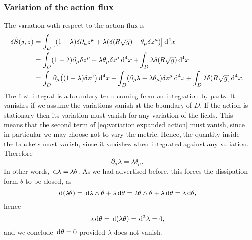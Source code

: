 \documentclass[../main.tex]{subfiles}
\begin{document}
\subsubsection{Variation of the action flux}\label{sec:variationonaction}
The variation with respect to the action flux is
\begin{align}
	\delta \tilde{S}(g, z) & = \int_D \big[(1-\lambda) \delta \partial_\mu z^\mu +
\lambda(\delta(R\sqrt{g}) - \theta_\mu \delta z^\mu)\big] \,\mathrm{d}^4 x \notag \\						& = \int_D (1 - \lambda) \partial_\mu \delta z^\mu -
			\lambda \theta_\mu \delta z^\mu \,\mathrm{d}^4x + \int_D \lambda
			\delta(R \sqrt{g}) \,\mathrm{d}^4 x \notag \\
& = \int_{D} \partial_\mu \big((1 -
		\lambda)\delta z^\mu\big) \,\mathrm{d}^4 x + \int_D (\partial_\mu \lambda
		- \lambda\theta_\mu) \delta z^\mu \,\mathrm{d}^4 x + \int_D \lambda
		\delta(R \sqrt{g}) \,\mathrm{d}^4 x \label{eq:variation expanded
										action}. 
\end{align}
The first integral is a boundary term coming from an integration by parts. It vanishes
if we assume the variations vanish at the boundary of \( D \). If the action is stationary then its variation must vanish for any variation of the fields. This means that the second term of \cref{eq:variation expanded action} must vanish, since in particular we may choose not to vary the metric. Hence, the quantity inside the brackets must vanish, since it vanishes when integrated against any variation. Therefore
\begin{equation} \label{eq:action flux variation}
	\partial_\mu \lambda = \lambda\theta_\mu.
\end{equation}
In other words, \( \,\mathrm{d} \lambda = \lambda \theta \). As we had advertised before, this forces the dissipation form \(\theta\) to be closed, as
\begin{equation*}
	\,\mathrm{d}(\lambda \theta) = \,\mathrm{d} \lambda \wedge \theta + \lambda \,\mathrm{d} \theta = \lambda \theta
	\wedge \theta + \lambda \,\mathrm{d} \theta = \lambda \,\mathrm{d} \theta,
\end{equation*}
hence
\begin{equation*}
	\lambda \,\mathrm{d} \theta = \,\mathrm{d}(\lambda \theta) = \,\mathrm{d}^2 \lambda = 0,
\end{equation*}
and we conclude \( \,\mathrm{d} \theta = 0 \) provided \(\lambda\) does not vanish. 
\end{document}
